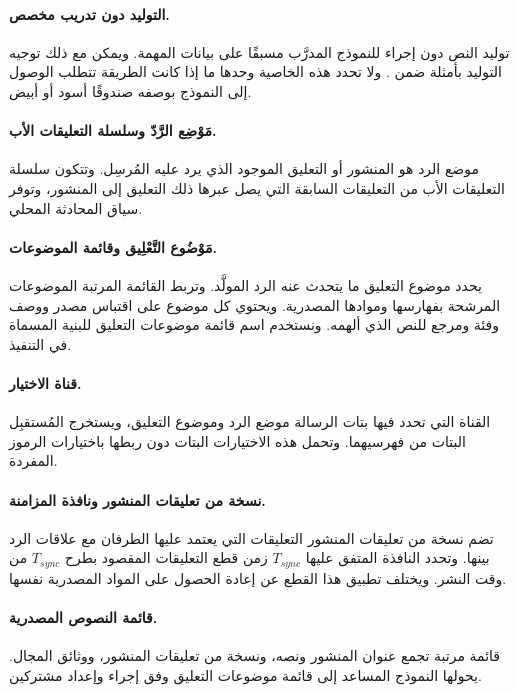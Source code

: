 \paragraph{التوليد دون تدريب مخصص.}
توليد النص دون إجراء  للنموذج المدرَّب مسبقًا على بيانات المهمة. ويمكن مع ذلك توجيه التوليد بأمثلة ضمن . ولا تحدد هذه الخاصية وحدها ما إذا كانت الطريقة تتطلب الوصول إلى النموذج بوصفه صندوقًا أسود أو أبيض.

\paragraph{مَوْضِع الرَّدّ وسلسلة التعليقات الأب.}
موضع الرد هو المنشور أو التعليق الموجود الذي يرد عليه المُرسِل. وتتكون سلسلة التعليقات الأب من التعليقات السابقة التي يصل عبرها ذلك التعليق إلى المنشور، وتوفر سياق المحادثة المحلي.

\paragraph{مَوْضُوع التَّعْلِيق وقائمة الموضوعات.}
يحدد موضوع التعليق ما يتحدث عنه الرد المولَّد. وتربط القائمة المرتبة الموضوعات المرشحة بفهارسها وموادها المصدرية. ويحتوي كل موضوع على اقتباس مصدر ووصف وفئة ومرجع للنص الذي ألهمه. ونستخدم اسم قائمة موضوعات التعليق للبنية المسماة  في التنفيذ.

\paragraph{قناة الاختيار.}
القناة التي تحدد فيها بتات الرسالة موضع الرد وموضوع التعليق، ويستخرج المُستقبِل البتات من فهرسيهما. وتحمل هذه الاختيارات البتات دون ربطها باختيارات الرموز المفردة.

\paragraph{نسخة من تعليقات المنشور ونافذة المزامنة.}
تضم نسخة من تعليقات المنشور التعليقات التي يعتمد عليها الطرفان مع علاقات الرد بينها. وتحدد النافذة المتفق عليها $T_{sync}$ زمن قطع التعليقات المقصود بطرح $T_{sync}$ من وقت النشر. ويختلف تطبيق هذا القطع عن إعادة الحصول على المواد المصدرية نفسها.

\paragraph{قائمة النصوص المصدرية.}
قائمة مرتبة تجمع عنوان المنشور ونصه، ونسخة من تعليقات المنشور، ووثائق المجال. يحولها النموذج المساعد إلى قائمة موضوعات التعليق وفق إجراء وإعداد مشتركين.

